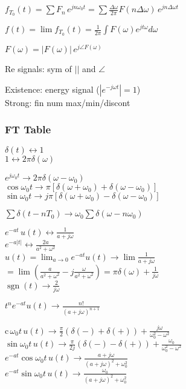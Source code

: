\documentclass[4pt]{article}
\theoremstyle{definition}
\theoremstyle{definition}
\renewcommand{\c}{\mathrm{c}\,}
\renewcommand{\o}{\omega}
\newcommand{\ra}{\rightarrow}
\newcommand{\lra}{\leftrightarrow}
\DeclareMathOperator{\sgn}{sgn}
\begin{document}
    \(f_{T_0}(t) = \sum F_n\, e^{jn\omega_0 t} = \sum \frac {\Delta\omega} {2\pi} F(n\Delta\omega)\,  e^{jn\Delta\omega t}\)

    \(f(t) = \lim f_{T_0} (t) = \frac{1}{2\pi}\int F(\omega) e^{jt\omega} d\omega\)

    \(F(\omega) = |F(\omega)| \, e^{j\angle F(\omega)}\)

    Re signals: sym of $||$ and $\angle$

    Existence: energy signal ($|e^{-j\o t}| = 1$)\\
    Strong: fin num max/min/discont

\subsubsection{FT Table}

    \(\delta(t) \lra 1\)\\
    $1 \lra 2\pi\delta(\omega)$

    \(e^{j\o_0 t}\ra 2\pi\delta(\o - \o_0)\)\\         %
    \(\cos \o_0 t\ra \pi[\delta(\o+\o_0) + \delta(\o - \o_0)]\)\\
    \(\sin \o_0 t\ra j\pi[\delta(\o + \o_0) - \delta(\o - \o_0)]\)

    \(\sum \delta(t-nT_0) \ra \o_0\sum \delta(\o - n\o_0)\)        %

    $e^{-at} \, u(t) \lra \frac{1}{a+j\omega}$\\         %
    $e^{-a|t|} \lra \frac{2a}{a^2+\omega^2}$ \\
    \(u(t) = \lim_{a\ra 0} e^{-at} u(t)\ra \lim \frac{1}{a+j\o}\)
    \( = \lim(\frac{a}{a^2+\o^2} - j\frac{\o}{a^2+\o^2 }) = \pi\delta(\o) + \frac{1}{j\o}\) \\      %
    \(\sgn(t)\ra \frac{2}{j\o}\)

    \(t^n e^{-at} u(t)\ra \frac{n!}{(a+j\o)^{n+1}}\)

    \(\c \o_0 t\, u(t)\ra \frac{\pi}{2}(\delta(-) + \delta(+)) + \frac{j\o}{\o_0^2-\o^2}\)\\       %
    \(\sin \o_0 t\, u(t)\ra \frac{\pi}{2j}(\delta(-) - \delta(+)) + \frac{\o_0}{\o_0^2-\o^2}\)\\
    \(e^{-at}\cos \o_0t\, u(t)\ra \frac{a+j\o}{(a+j\o)^2 + \o_0^2}\)\\
    \(e^{-at}\sin \o_0t\, u(t)\ra \frac{\o_0}{(a+j\o)^2 + \o_0^2}\)           
\end{document}

